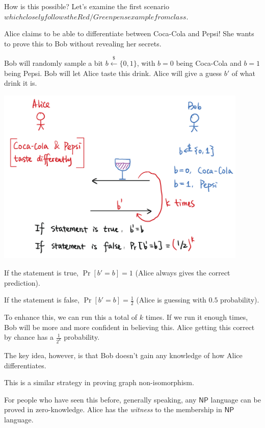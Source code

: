How is this possible? Let's examine the first scenario \(which closely follows the Red/Green pens example from class\).
\begin{example*}
    Alice claims to be able to differentiate between Coca-Cola and Pepsi! She wants to prove this to Bob without revealing her secrets.

    Bob will randomly sample a bit $b\overset{\$}{\leftarrow}\{0, 1\}$, with $b=0$ being Coca-Cola and $b=1$ being Pepsi. Bob will let Alice taste this drink. Alice will give a guess $b'$ of what drink it is.

    \begin{center}
        \includegraphics[width=0.9\textwidth]{images/2023-01-26/zk_cola.png}
    \end{center}

    If the statement is true, $\Pr[b' = b] = 1$ (Alice always gives the correct prediction).

    If the statement is false, $\Pr[b' = b] = \frac{1}{2}$ (Alice is guessing with $0.5$ probability).

    To enhance this, we can run this a total of $k$ times. If we run it enough times, Bob will be more and more confident in believing this. Alice getting this correct by chance has a $\frac{1}{2^k}$ probability.

    The key idea, however, is that Bob doesn't gain any knowledge of how Alice differentiates.

    \begin{remark*}
        This is a similar strategy in proving graph non-isomorphism.

        For people who have seen this before, generally speaking, any $\textsf{NP}$ language can be proved in zero-knowledge. Alice has the \emph{witness} to the membership in $\textsf{NP}$ language.
    \end{remark*}
\end{example*}

